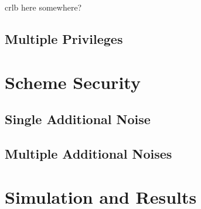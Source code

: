 \documentclass[conference]{IEEEtran}
\theoremstyle{definition}
\theoremstyle{definition}
\theoremstyle{remark}
\begin{document}
crlb here somewhere?


\subsection{Multiple Privileges}


\section{Scheme Security}

\subsection{Single Additional Noise}

\subsection{Multiple Additional Noises}


\section{Simulation and Results}


%
%

\end{document}
